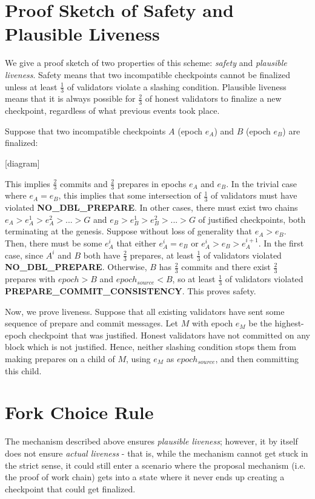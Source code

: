 \documentclass[12pt]{article}
\begin{document}
\section{Proof Sketch of Safety and Plausible Liveness}

We give a proof sketch of two properties of this scheme: \textit{safety} and \textit{plausible liveness}. Safety means that two incompatible checkpoints cannot be finalized unless at least $\frac{1}{3}$ of validators violate a slashing condition. Plausible liveness means that it is always possible for $\frac{2}{3}$ of honest validators to finalize a new checkpoint, regardless of what previous events took place.

Suppose that two incompatible checkpoints $A$ (epoch $e_A$) and $B$ (epoch $e_B$) are finalized:

[diagram]

This implies $\frac{2}{3}$ commits and $\frac{2}{3}$ prepares in epochs $e_A$ and $e_B$. In the trivial case where $e_A = e_B$, this implies that some intersection of $\frac{1}{3}$ of validators must have violated \textbf{NO\_DBL\_PREPARE}. In other cases, there must exist two chains $e_A > e_A^1 > e_A^2 > ... > G$ and $e_B > e_B^1 > e_B^2 > ... > G$ of justified checkpoints, both terminating at the genesis. Suppose without loss of generality that $e_A > e_B$. Then, there must be some $e_A^i$ that either $e_A^i = e_B$ or $e_A^i > e_B > e_A^{i+1}$. In the first case, since $A^i$ and $B$ both have $\frac{2}{3}$ prepares, at least $\frac{1}{3}$ of validators violated \textbf{NO\_DBL\_PREPARE}. Otherwise, $B$ has $\frac{2}{3}$ commits and there exist $\frac{2}{3}$ prepares with $epoch > B$ and $epoch_{source} < B$, so at least $\frac{1}{3}$ of validators violated \textbf{PREPARE\_COMMIT\_CONSISTENCY}. This proves safety.

Now, we prove liveness. Suppose that all existing validators have sent some sequence of prepare and commit messages. Let $M$ with epoch $e_M$ be the highest-epoch checkpoint that was justified. Honest validators have not committed on any block which is not justified. Hence, neither slashing condition stops them from making prepares on a child of $M$, using $e_M$ as $epoch_{source}$, and then committing this child.

\section{Fork Choice Rule}

The mechanism described above ensures \textit{plausible liveness}; however, it by itself does not ensure \textit{actual liveness} - that is, while the mechanism cannot get stuck in the strict sense, it could still enter a scenario where the proposal mechanism (i.e. the proof of work chain) gets into a state where it never ends up creating a checkpoint that could get finalized.
\end{document}

